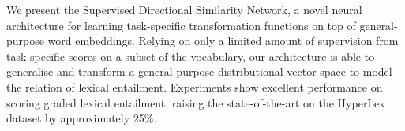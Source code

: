 We present the Supervised Directional Similarity Network, a novel neural architecture for learning task-specific transformation functions on top of general-purpose word embeddings. Relying on only a limited amount of supervision from task-specific scores on a subset of the vocabulary, our architecture is able to generalise and transform a general-purpose distributional vector space to model the relation of lexical entailment. Experiments show excellent performance on scoring graded lexical entailment, raising the state-of-the-art on the HyperLex dataset by approximately 25\%.
